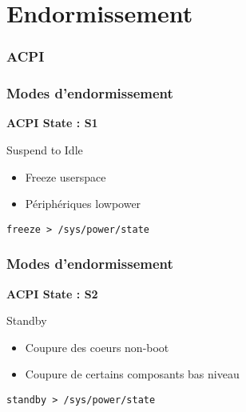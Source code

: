 \section{Endormissement}

\begin{frame}
	\frametitle{ACPI}
\end{frame}

\begin{frame}
	\frametitle{Modes d'endormissement}
	\textbf{ACPI State : S1}
	\begin{block}{Suspend to Idle}
		\begin{itemize}
			\item Freeze userspace
			\item Périphériques lowpower
		\end{itemize}
	\end{block}
	\texttt{freeze > /sys/power/state}
\end{frame}
\begin{frame}
	\frametitle{Modes d'endormissement}
	\textbf{ACPI State : S2}
	\begin{block}{Standby}
		\begin{itemize}
			\item Coupure des coeurs non-boot
			\item Coupure de certains composants bas niveau
		\end{itemize}
	\end{block}
	\texttt{standby > /sys/power/state}
\end{frame}

